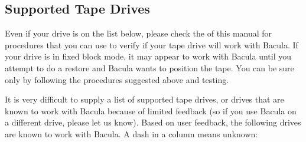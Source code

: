\subsection*{Supported Tape Drives}
\label{SupportedDrives}

Even if your drive is on the list below, please check the 
 of this manual for
procedures that you can use to verify if your tape drive will work with
Bacula. If your drive is in fixed block mode, it may appear to work with
Bacula until you attempt to do a restore and Bacula wants to position the
tape. You can be sure only by following the procedures suggested above and
testing. 

It is very difficult to supply a list of supported tape drives, or drives that
are known to work with Bacula because of limited feedback (so if you use
Bacula on a different drive, please let us know). Based on user feedback, the
following drives are known to work with Bacula. A dash in a column means
unknown: 

